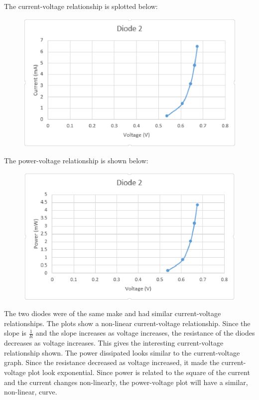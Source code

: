 \documentclass[twocolumn, amsmath]{revtex4}
\begin{document}
The current-voltage relationship is splotted below:
	
\begin{figure}[h]  

\includegraphics[scale = 0.4]{diode2new.eps}  
\end{figure} 

\newpage

The power-voltage relationship is shown below:

\begin{figure}[h]  

\includegraphics[scale = 0.4]{powerdiode2.eps}  
\end{figure}


The two diodes were of the same make and had similar current-voltage relationships. The plots show a non-linear current-voltage relationship. Since the slope is $\frac{1}{R}$ and the slope increases as voltage increases, the resistance of the diodes decreases as voltage increases. This gives the interesting current-voltage relationship shown. The power dissipated looks similar to the current-voltage graph. Since the resistance decreased as voltage increased, it made the current-voltage plot look exponential. Since power is related to the square of the current and the current changes non-linearly, the power-voltage plot will have a similar, non-linear, curve. 
\end{document}
